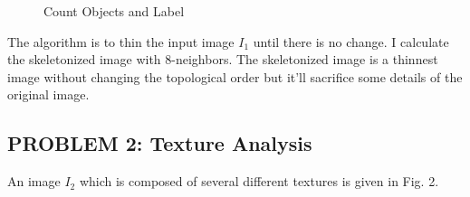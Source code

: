 \documentclass{article}
\begin{document}
\begin{enumerate}[label=(\alph*)]
\begin{figure}[!htb]
            \caption{Count Objects and Label}
        \end{figure}

        The algorithm is to thin the input image $I_1$ until there is no change. I calculate the skeletonized image with 8-neighbors. The skeletonized image is a thinnest image without changing the topological order but it'll sacrifice some details of the original image.

    \end{enumerate}

\newpage
\subsection*{PROBLEM 2: Texture Analysis}
    An image $I_2$ which is composed of several different textures is given in Fig. 2.
\end{document}
